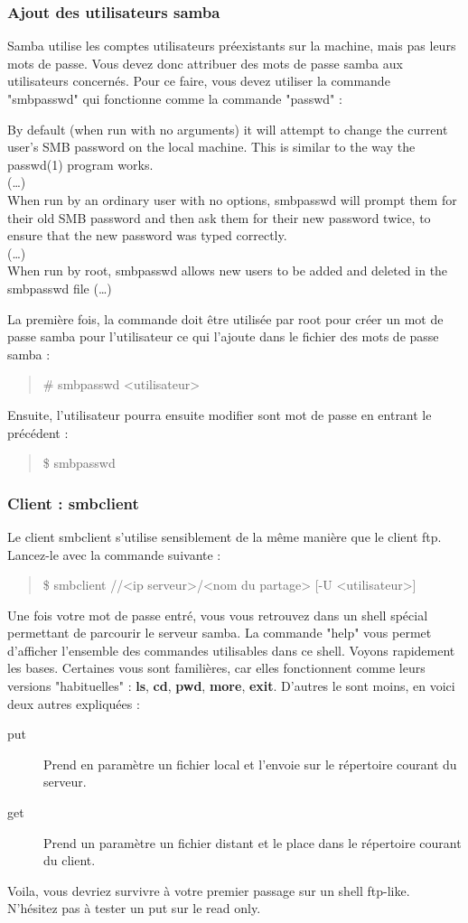 \documentclass[a4paper,11pt]{article}
\newcommand{\commande}[1] {
    \begin{quote}
    \tt\raggedright #1
    \end{quote}
}
\newcommand{\man}[2]{
    \begin{tcolorbox}[toprule=3mm,width=\textwidth,outer arc=0mm,colbacktitle=grayman,coltitle=black,colback={grayman},colframe={grayman},title={man : \tt #1}]
        \tt\raggedright #2
    \end{tcolorbox}
}
\begin{document}
\subsubsection{Ajout des utilisateurs samba}
\par Samba utilise les comptes utilisateurs préexistants sur la machine, mais pas leurs mots de passe. Vous devez donc attribuer des mots de passe samba aux utilisateurs concernés. Pour ce faire, vous devez utiliser la commande "smbpasswd" qui fonctionne comme la commande "passwd" :
\man{smbpasswd}{
By default (when run with no arguments) it will attempt to change the current user's SMB password on the local machine. This is similar to the way the passwd(1) program works.\\
(\dots)\\
When run by an ordinary user with no options, smbpasswd will prompt them for their old SMB password and then ask them for their new password twice, to ensure that the new password was typed correctly.\\
(\dots)\\
When run by root, smbpasswd allows new users to be added and deleted in the smbpasswd file (\dots)\\
}
\par La première fois, la commande doit être utilisée par root pour créer un mot de passe samba pour l'utilisateur ce qui l'ajoute dans le fichier des mots de passe samba :
\commande{\# smbpasswd <utilisateur>}
\par Ensuite, l'utilisateur pourra ensuite modifier sont mot de passe en entrant le précédent :
\commande{\$ smbpasswd}

\subsubsection{Client : smbclient}
\par Le client smbclient s'utilise sensiblement de la même manière que le client ftp. Lancez-le avec la commande suivante :
\commande{\$ smbclient //<ip serveur>/<nom du partage> [-U <utilisateur>]}
\par Une fois votre mot de passe entré, vous vous retrouvez dans un shell spécial permettant de parcourir le serveur samba. La commande "help" vous permet d'afficher l'ensemble des commandes utilisables dans ce shell. Voyons rapidement les bases. Certaines vous sont familières, car elles fonctionnent comme leurs versions "habituelles" : \textbf{ls}, \textbf{cd}, \textbf{pwd}, \textbf{more}, \textbf{exit}. D'autres le sont moins, en voici deux autres expliquées :
\begin{description}
\item[put] Prend en paramètre un fichier local et l'envoie sur le répertoire courant du serveur.
\item[get] Prend un paramètre un fichier distant et le place dans le répertoire courant du client.
\end{description}
\par Voila, vous devriez survivre à votre premier passage sur un shell ftp-like. N'hésitez pas à tester un put sur le read only.
\end{document}
